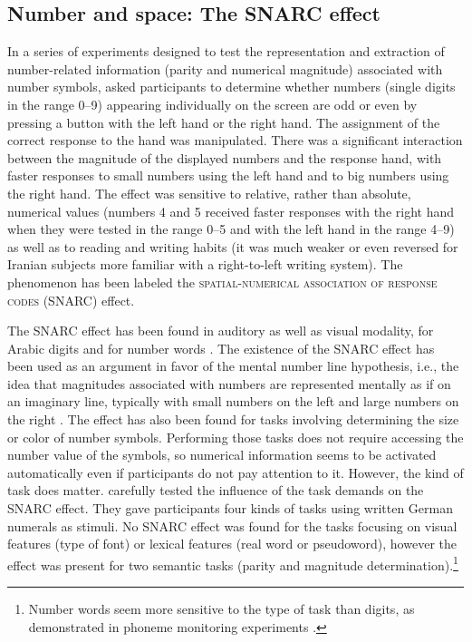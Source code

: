 \documentclass[output=paper]{langscibook}
\begin{document}
\subsection{Number and space: The SNARC effect}

In a series of experiments designed to test the representation and extraction of number-related information (parity and numerical magnitude) associated with number symbols, \citet{dehaeneMentalRepresentationParity1993} asked participants to determine whether numbers (single digits in the range 0--9) appearing individually on the screen are odd or even by pressing a button with the left hand or the right hand. The assignment of the correct response to the hand was manipulated. There was a significant interaction between the magnitude of the displayed numbers and the response hand, with faster responses to small numbers using the left hand and to big numbers using the right hand. The effect was sensitive to relative, rather than absolute, numerical values (numbers 4 and 5 received faster responses with the right hand when they were tested in the range 0--5 and with the left hand in the range 4--9) as well as to reading and writing habits (it was much weaker or even reversed for Iranian subjects more familiar with a right-to-left writing system). The phenomenon has been labeled the \textsc{spatial-numerical association of response codes} (SNARC) effect.

The SNARC effect has been found in auditory as well as visual modality, for Arabic digits and for number words \citep{nuerkUniversalSNARCEffect2005}. The existence of the SNARC effect has been used as an argument in favor of the mental number line hypothesis, i.e., the idea that magnitudes associated with numbers are represented mentally as if on an imaginary line, typically with small numbers on the left and large numbers on the right \citep{dehaeneMentalRepresentationParity1993,gobelCulturalNumberLine2011,paveseSymbolicDistanceNumerosity1998}. The effect has also been found for tasks involving determining the size \citep{fitousiRoleParityPhysical2009} or color \citep{keusSearchingFunctionalLocus2005} of number symbols. Performing those tasks does not require accessing the number value of the symbols, so numerical information seems to be activated automatically even if participants do not pay attention to it. However, the kind of task does matter. \citet{rottgerGrammaticalNumberElicits2015} carefully tested the influence of the task demands on the SNARC effect. They gave participants four kinds of tasks using written German numerals as stimuli. No SNARC effect was found for the tasks focusing on visual features (type of font) or lexical features (real word or pseudoword), however the effect was present for two semantic tasks (parity and magnitude determination).\footnote{Number words seem more sensitive to the type of task than digits, as demonstrated in phoneme monitoring experiments \citep{fiasTwoRoutesProcessing2001,fiasImportanceMagnitudeInformation1996}.}   
\end{document}
